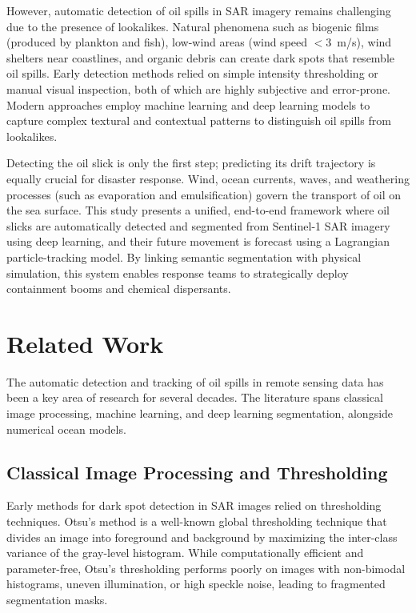 \documentclass[conference]{IEEEtran}
\begin{document}
However, automatic detection of oil spills in SAR imagery remains challenging due to the presence of lookalikes. Natural phenomena such as biogenic films (produced by plankton and fish), low-wind areas (wind speed $< 3$~m/s), wind shelters near coastlines, and organic debris can create dark spots that resemble oil spills. Early detection methods relied on simple intensity thresholding or manual visual inspection, both of which are highly subjective and error-prone. Modern approaches employ machine learning and deep learning models to capture complex textural and contextual patterns to distinguish oil spills from lookalikes.

Detecting the oil slick is only the first step; predicting its drift trajectory is equally crucial for disaster response. Wind, ocean currents, waves, and weathering processes (such as evaporation and emulsification) govern the transport of oil on the sea surface. This study presents a unified, end-to-end framework where oil slicks are automatically detected and segmented from Sentinel-1 SAR imagery using deep learning, and their future movement is forecast using a Lagrangian particle-tracking model. By linking semantic segmentation with physical simulation, this system enables response teams to strategically deploy containment booms and chemical dispersants.

\section{Related Work}
The automatic detection and tracking of oil spills in remote sensing data has been a key area of research for several decades. The literature spans classical image processing, machine learning, and deep learning segmentation, alongside numerical ocean models.

\subsection{Classical Image Processing and Thresholding}
Early methods for dark spot detection in SAR images relied on thresholding techniques. Otsu's method is a well-known global thresholding technique that divides an image into foreground and background by maximizing the inter-class variance of the gray-level histogram. While computationally efficient and parameter-free, Otsu's thresholding performs poorly on images with non-bimodal histograms, uneven illumination, or high speckle noise, leading to fragmented segmentation masks.
\end{document}
